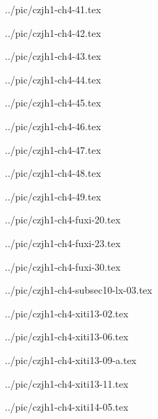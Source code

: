 

../pic/czjh1-ch4-41.tex



../pic/czjh1-ch4-42.tex



../pic/czjh1-ch4-43.tex



../pic/czjh1-ch4-44.tex



../pic/czjh1-ch4-45.tex



../pic/czjh1-ch4-46.tex



../pic/czjh1-ch4-47.tex



../pic/czjh1-ch4-48.tex



../pic/czjh1-ch4-49.tex



../pic/czjh1-ch4-fuxi-20.tex



../pic/czjh1-ch4-fuxi-23.tex



../pic/czjh1-ch4-fuxi-30.tex



../pic/czjh1-ch4-subsec10-lx-03.tex



../pic/czjh1-ch4-xiti13-02.tex



../pic/czjh1-ch4-xiti13-06.tex



../pic/czjh1-ch4-xiti13-09-a.tex



../pic/czjh1-ch4-xiti13-11.tex



../pic/czjh1-ch4-xiti14-05.tex

